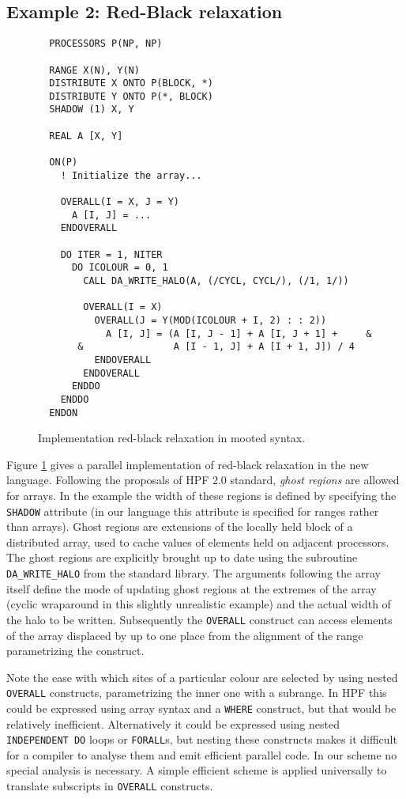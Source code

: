 \subsection{Example 2: Red-Black relaxation}

\begin{figure}[btp]
\footnotesize
\begin{verbatim}
  PROCESSORS P(NP, NP)

  RANGE X(N), Y(N)
  DISTRIBUTE X ONTO P(BLOCK, *)
  DISTRIBUTE Y ONTO P(*, BLOCK)
  SHADOW (1) X, Y

  REAL A [X, Y]

  ON(P)
    ! Initialize the array...

    OVERALL(I = X, J = Y)
      A [I, J] = ...
    ENDOVERALL

    DO ITER = 1, NITER
      DO ICOLOUR = 0, 1
        CALL DA_WRITE_HALO(A, (/CYCL, CYCL/), (/1, 1/))

        OVERALL(I = X)
          OVERALL(J = Y(MOD(ICOLOUR + I, 2) : : 2))
            A [I, J] = (A [I, J - 1] + A [I, J + 1] +     &
       &                A [I - 1, J] + A [I + 1, J]) / 4
          ENDOVERALL
        ENDOVERALL
      ENDDO 
    ENDDO
  ENDON
\end{verbatim}
\normalsize
\caption{\label{red_black}Implementation red-black relaxation in
mooted syntax.}
\end{figure}

Figure \ref{red_black} gives a parallel implementation
of red-black relaxation in the new language.  Following the
proposals of HPF 2.0 standard, {\em ghost regions} are allowed
for arrays.  In the example the width of these regions is defined by
specifying the {\tt SHADOW} attribute (in our language this attribute is
specified for ranges rather than arrays).  Ghost regions are extensions
of the locally held block of a distributed array, used to cache
values of elements held on adjacent processors.  The ghost regions are
explicitly brought up to date using the subroutine {\tt DA\_WRITE\_HALO}
from the standard library.  The arguments following the array itself
define the mode of updating ghost regions at the extremes of the array
(cyclic wraparound in this slightly unrealistic example) and the actual
width of the halo to be written.  Subsequently the {\tt OVERALL}
construct can access elements of the array displaced by up to one place
from the alignment of the range parametrizing the construct.

Note the ease with which sites of a particular colour are selected
by using nested {\tt OVERALL} constructs, parametrizing the inner one
with a subrange.  In HPF this could be expressed using array syntax
and a {\tt WHERE} construct, but that would be relatively inefficient.
Alternatively it could be expressed using nested {\tt INDEPENDENT DO} loops or
{\tt FORALL}s, but nesting these constructs makes it difficult for
a compiler to analyse them and emit efficient parallel code.  In our
scheme no special analysis is necessary.  A simple efficient scheme is
applied universally to translate subscripts in {\tt OVERALL}
constructs.


